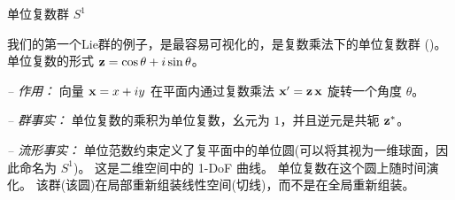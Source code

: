 

\begin{fexample}	{单位复数群 $S^1$}
\label{ex:S1}

我们的第一个Lie群的例子，是最容易可视化的，是复数乘法下的单位复数群 ()。
单位复数的形式 ${\bf z}=\cos\theta+i\sin\theta$。

\emph{-- 作用：}
向量 ${\bf x}=x+iy$ 在平面内通过复数乘法 ${\bf x}'={\bf z}\,{\bf x}$ 旋转一个角度 $\theta$。

\emph{-- 群事实：}
单位复数的乘积为单位复数，幺元为 $1$，并且逆元是共轭 ${\bf z}^*$。

\emph{-- 流形事实：} 
单位范数约束定义了复平面中的单位圆(可以将其视为一维球面，因此命名为 $S^1$)。
这是二维空间中的 1-DoF 曲线。 
单位复数在这个圆上随时间演化。
该群(该圆)在局部重新组装线性空间(切线)，而不是在全局重新组装。
\end{fexample}
